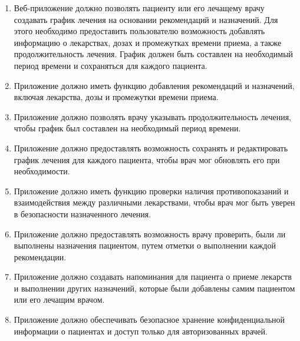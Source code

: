 \documentclass[14pt]{extreport}
\begin{document}
        \begin{enumerate}
            \item Веб-приложение должно позволять пациенту или его %
            лечащему врачу создавать график лечения на основании %
            рекомендаций и назначений. Для этого необходимо предоставить %
            пользователю возможность добавлять информацию о лекарствах, %
            дозах и промежутках времени приема, а также продолжительность %
            лечения. График должен быть составлен на необходимый период %
            времени и сохраняться для каждого пациента.
            
            \item Приложение должно иметь функцию добавления %
            рекомендаций и назначений, включая лекарства, %
            дозы и промежутки времени приема.

            \item Приложение должно позволять врачу указывать %
            продолжительность лечения, чтобы график был составлен %
            на необходимый период времени.

            \item Приложение должно предоставлять возможность %
            сохранять и редактировать график лечения для каждого %
            пациента, чтобы врач мог обновлять его при необходимости.

            \item Приложение должно иметь функцию проверки наличия %
            противопоказаний и взаимодействия между различными %
            лекарствами, чтобы врач мог быть уверен в безопасности %
            назначенного лечения.

            \item Приложение должно предоставлять возможность %
            врачу проверить, были ли выполнены назначения пациентом, %
            путем отметки о выполнении каждой рекомендации.

            \item Приложение должно создавать напоминания для пациента %
            о приеме лекарств и выполнении других назначений, %
            которые были добавлены самим пациентом или его лечащим врачом.

            \item Приложение должно обеспечивать безопасное хранение %
            конфиденциальной информации о пациентах и доступ только %
            для авторизованных врачей.
        \end{enumerate}
\end{document}
